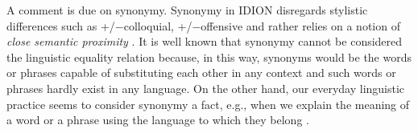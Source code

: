 \documentclass[output=paper,colorlinks,citecolor=brown]{langscibook}
\begin{document}
A comment is due on synonymy. Synonymy in IDION disregards stylistic differences such as +/−colloquial, +/−offensive and rather relies on a notion of \textit{close semantic proximity} \citep[39]{hullen}.  It is well known that synonymy cannot be considered the linguistic equality relation because, in this way, synonyms would be the words or phrases capable of substituting each other in any context and such words or phrases hardly exist in any language. On the other hand, our everyday linguistic practice seems to consider synonymy a fact, e.g., when we explain the meaning of a word or a phrase using the language to which they belong  \citep[38]{hullen}. 

\end{document}
